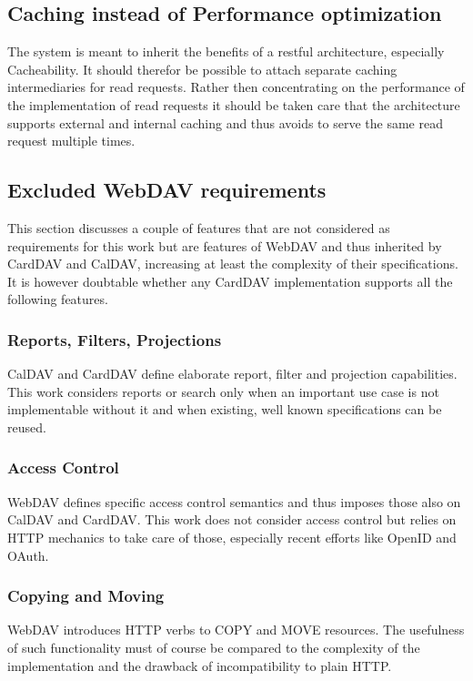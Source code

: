 \documentclass[11pt,a4paper,headsepline,twoside]{scrartcl}		%
\begin{document}
\subsection{Caching instead of Performance optimization}
The system is meant to inherit the benefits of a restful architecture,
especially Cacheability. It should therefor be possible to attach separate
caching intermediaries for read requests. Rather then concentrating on the
performance of the implementation of read requests it should be taken care that
the architecture supports external and internal caching and thus avoids to serve
the same read request multiple times.

\subsection{Excluded WebDAV requirements}
\label{sec:excluded-requirements}

This section discusses a couple of features that are not considered as
requirements for this work but are features of WebDAV and thus inherited by
CardDAV and CalDAV, increasing at least the complexity of their
specifications. It is however doubtable whether any CardDAV implementation
supports all the following features.

\subsubsection{Reports, Filters, Projections}

CalDAV and CardDAV define elaborate report, filter and projection
capabilities. This work considers reports or search only when an important use
case is not implementable without it and when existing, well known
specifications can be reused.

\subsubsection{Access Control}
WebDAV defines specific access control semantics and thus imposes those also on
CalDAV and CardDAV. This work does not consider access control but relies on
HTTP mechanics to take care of those, especially recent efforts like OpenID and
OAuth. %

\subsubsection{Copying and Moving}
WebDAV introduces HTTP verbs to COPY and MOVE resources. The usefulness of such
functionality must of course be compared to the complexity of the implementation
and the drawback of incompatibility to plain HTTP.
\end{document}
